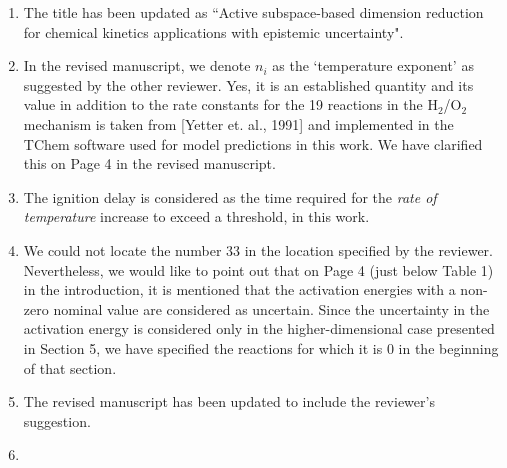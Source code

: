 \documentclass[11pt,final]{article}
\newcommand{\referee}[1]{\vspace{.1ex}\noindent{\textcolor{blue}{#1}}}
\begin{document}
\begin{enumerate}[wide, labelwidth=!, labelindent=0pt]
\item \referee{Why not use the word 'active' in the title, since active subspace is essentially
what has been done here?}

\noindent  The title has been updated as ``Active subspace-based dimension reduction for chemical kinetics
applications with epistemic uncertainty".

\item \referee{3.36 $n_i$ is index or power? Is this an established term for the power of T? 
Also, what are the values of $n_i$'s?}

\noindent  In the revised manuscript, we denote $n_i$ as the `temperature exponent' as suggested by
the other reviewer. Yes, it is an established quantity and its value in addition to the
rate constants for the 19 reactions
in the H$_2$/O$_2$ mechanism is taken from [Yetter et. al., 1991] and implemented in the
TChem software used for model predictions in this work. We have clarified this on Page 4
in the revised manuscript. 

\item \referee{3.51 'rate of temperature' or 'temperature'?}

\noindent  The ignition delay is considered as the time required for the {\it rate of temperature}
increase to exceed a threshold, in this work.

\item \referee{4.57 not clear where the number 33 comes from since we have 19 reactions. I see it is explained at the beginning of Section 5, but it should be noted here briefly, too.}

\noindent  We could not locate the number 33 in the location specified by the reviewer. Nevertheless, we would like
to point out that on Page 4 (just below Table 1) in the introduction, 
it is mentioned that the activation energies with a non-zero nominal value are considered as uncertain. 
Since the uncertainty in the activation energy is considered only in the higher-dimensional case
presented in Section 5, we have
specified the reactions for which it is 0 in the beginning of that section.

\item \referee{6.19 distribution-$>$density function}

\noindent  The revised manuscript has been updated to include the reviewer's suggestion. 

\item \referee{6.38: typo, $w_r$ should be $w_1$}


\end{enumerate}
\end{document}
